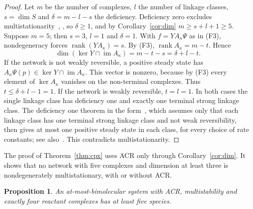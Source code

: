 \documentclass[11pt]{amsart}
\newtheorem{proposition}[theorem]{Proposition}
\theoremstyle{definition}
\theoremstyle{remark}
\begin{document}
\begin{proof}
Let $m$ be the number of complexes, $l$ the number of linkage classes, $s=\dim S$ and $\delta=m-l-s$ the deficiency. Deficiency zero excludes multistationarity~\cite{horn1972,feinberg1987}, \cite[Lemma~2.4]{kns2024}, so $\delta\ge1$, and by Corollary~\ref{cor:dim} $m\ge s+l+1\ge5$. Suppose $m=5$; then $s=3$, $l=1$ and $\delta=1$. With $f=YA_\kappa\Psi$ as in (F3), nondegeneracy forces $\operatorname{rank}(YA_\kappa)=s$. By (F3), $\operatorname{rank}A_\kappa=m-t$. Hence
\[
 \dim(\ker Y\cap\operatorname{im}A_\kappa)=m-t-s=\delta+l-t .
\]
If the network is not weakly reversible, a positive steady state has $A_\kappa\Psi(p)\in\ker Y\cap\operatorname{im}A_\kappa$. This vector is nonzero, because by (F3) every element of $\ker A_\kappa$ vanishes on the non-terminal complexes. Thus $t\le\delta+l-1=1$. If the network is weakly reversible, $t=l=1$. In both cases the single linkage class has deficiency one and exactly one terminal strong linkage class. The deficiency one theorem in the form~\cite[Theorem~6.2.1 and Corollary~6.2.2]{feinberg1987}, which assumes only that each linkage class has one terminal strong linkage class and not weak reversibility, then gives at most one positive steady state in each class, for every choice of rate constants; see also~\cite{feinberg1995}. This contradicts multistationarity.
\end{proof}

The proof of Theorem~\ref{thm:cpx} uses ACR only through Corollary~\ref{cor:dim}. It shows that no network with five complexes and dimension at least three is nondegenerately multistationary, with or without ACR.

\begin{proposition}\label{prop:four}
An at-most-bimolecular system with ACR, multistability and exactly four reactant complexes has at least five species.
\end{proposition}
\end{document}
